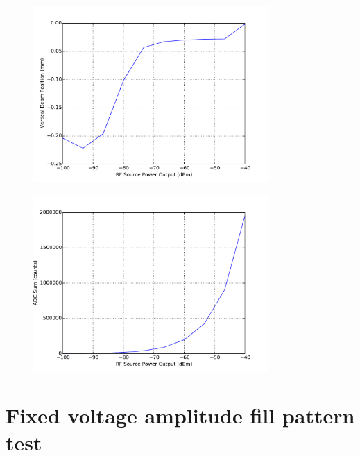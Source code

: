 \documentclass[a4paper, 11pt]{article}%
\begin{document}
%


\begin{figure}[htbp]%
\centering%
\includegraphics[width=0.8\textwidth]{./Results/power_vs_Y.pdf}%
\caption{}%
\end{figure}

%


\begin{figure}[htbp]%
\centering%
\includegraphics[width=0.8\textwidth]{./Results/power_vs_ADC_sum.pdf}%
\caption{}%
\end{figure}

%
\clearpage%
\section{Fixed voltage amplitude fill pattern test}%
\end{document}
